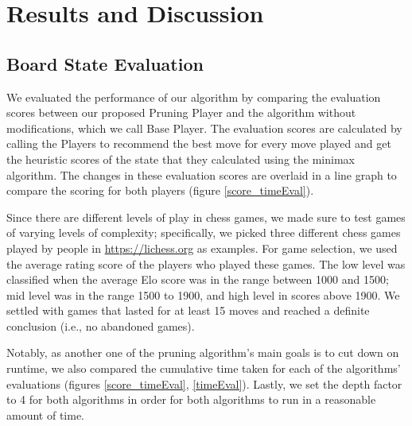 \documentclass[letterpaper]{article}
\begin{document}
\section{Results and Discussion}

\subsection{Board State Evaluation}
We evaluated the performance of our algorithm by comparing the evaluation scores between our proposed Pruning Player and the algorithm without modifications, which we call Base Player.  The evaluation scores are calculated by calling the Players to recommend the best move for every move played and get the heuristic scores of the state that they calculated using the minimax algorithm. The changes in these evaluation scores are overlaid in a line graph to compare the scoring for both players (figure \ref{score_timeEval}).

Since there are different levels of play in chess games, we made sure to test games of varying levels of complexity; specifically, we picked three different chess games played by people in \url{https://lichess.org} as examples. For game selection, we used the average rating score of the players who played these games. The low level was classified when the average Elo score was in the range between 1000 and 1500; mid level was in the range 1500 to 1900, and high level in scores above 1900. We settled with games that lasted for at least 15 moves and reached a definite conclusion (i.e., no abandoned games).

Notably, as another one of the pruning algorithm’s main goals is to cut down on runtime, we also compared the cumulative time taken for each of the algorithms' evaluations (figures \ref{score_timeEval}, \ref{timeEval}).  Lastly, we set the depth factor to 4 for both algorithms in order for both algorithms to run in a reasonable amount of time.
\end{document}
